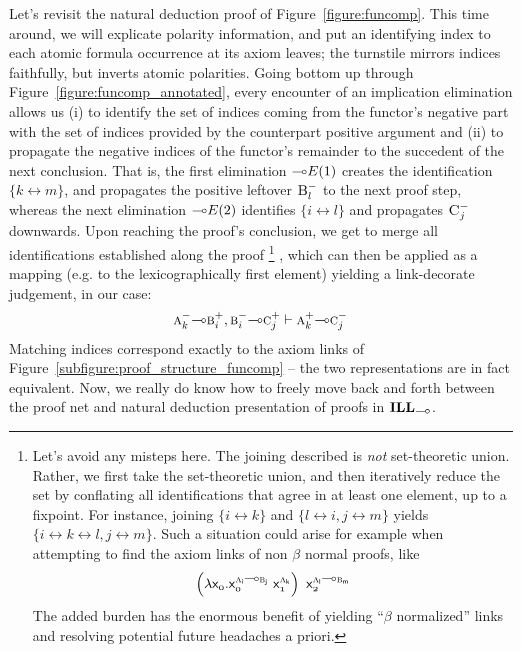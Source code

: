 Let's revisit the natural deduction proof of Figure~\ref{figure:funcomp}.
This time around, we will explicate polarity information, and put an identifying index to each atomic formula occurrence at its axiom leaves; 
the turnstile mirrors indices faithfully, but inverts atomic polarities.
Going bottom up through Figure~\ref{figure:funcomp_annotated}, every encounter of an implication elimination allows us (i) to identify the set of indices coming from the functor's negative part with the set of indices provided by the counterpart positive argument and (ii) to propagate the negative indices of the functor's remainder to the succedent of the next conclusion.
That is, the first elimination $\li E(1)$ creates the identification $\{k \leftrightarrow m\}$, and propagates the positive leftover $\normalfont\textsc{B}^{-}_l$ to the next proof step, whereas the next elimination $\li E(2)$ identifies $\{i \leftrightarrow l\}$ and propagates $\normalfont\textsc{C}^{-}_j$ downwards.
Upon reaching the proof's conclusion, we get to merge all identifications established along the proof%
\footnote{
Let's avoid any misteps here. The joining described is \textit{not} set-theoretic union. Rather, we first take the set-theoretic union, and then iteratively reduce the set by conflating all identifications that agree in at least one element, up to a fixpoint.
For instance, joining $\{ i \leftrightarrow k\}$ and $\{ l\leftrightarrow i, j \leftrightarrow m\}$ yields $\{i \leftrightarrow k \leftrightarrow l, j \leftrightarrow m \}$. Such a situation could arise for example when attempting to find the axiom links of non $\beta$ normal proofs, like
\[
\term{\left(\lam \Var{0}.\Var{0}^{\prop{a}_i \li \prop{b}_j}~\Var{1}^{\prop{a}_k}\right)~\Var{2}^{\prop{a}_l \li \prop{b}_m}}
\]
The added burden has the enormous benefit of yielding ``$\beta$ normalized'' links and resolving potential future headaches a priori.
}%
, which can then be applied as a mapping (e.g. to the lexicographically first element) yielding a link-decorate judgement, in our case:
\[
	\nprop{a}_k \li \pprop{b}_i, \nprop{b}_i \li \pprop{c}_j \vdash \pprop{a}_k \li \nprop{c}_j
\]
Matching indices correspond exactly to the axiom links of Figure~\ref{subfigure:proof_structure_funcomp} -- the two representations are in fact equivalent.
Now, we really do know how to freely move back and forth between the proof net and natural deduction presentation of proofs in $\ILL_{\li}$.

